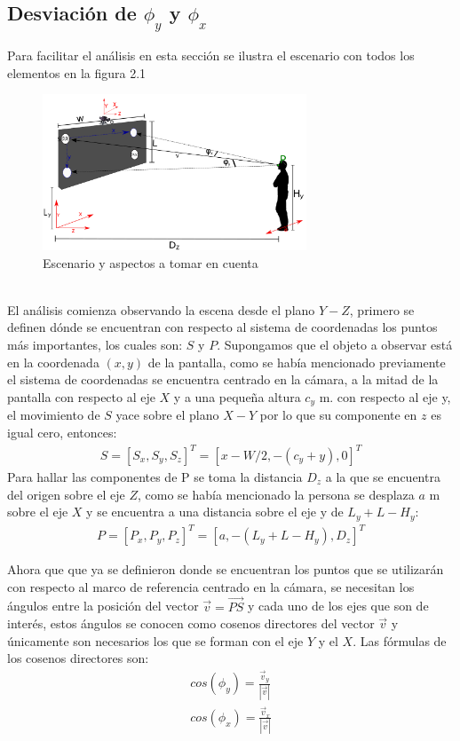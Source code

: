 \documentclass[paper=a4, fontsize=11pt]{scrartcl} %
\numberwithin{equation}{section} %
\numberwithin{figure}{section} %
\numberwithin{table}{section} %
\begin{document}
\subsection{Desviación de $\phi_y$ y $\phi_x$}
Para facilitar el análisis en esta sección se ilustra el escenario con todos los elementos en la figura 2.1
\begin{figure}[htbp]
	\centering
	\includegraphics[width=0.7\textwidth]{escenario}
	\caption{Escenario y aspectos a tomar en cuenta}\label{fig: figura}
\end{figure}
\\El análisis comienza observando la escena desde el plano $Y-Z$, primero se definen dónde se encuentran con respecto al sistema de coordenadas los puntos más importantes, los cuales son: $S$ y $P$. Supongamos que el objeto a observar está en la coordenada $(x,y)$ de la pantalla, como se había mencionado previamente el sistema de coordenadas se encuentra centrado en la cámara,  a la mitad de la pantalla con respecto al eje $X$ y a una pequeña altura $c_y$ m. con respecto al eje y, el movimiento de $S$ yace sobre el plano $X-Y$ por lo que su componente en $z$ es igual cero, entonces:
\begin{eqnarray}
S= [S_x, S_y, S_z]^T= [x-W/2, -(c_y+y), 0]^T
 \end{eqnarray}
Para hallar las componentes de P se toma la distancia $D_z$ a la que se encuentra del origen sobre el eje $Z$, como se había mencionado la persona se desplaza $a$ m sobre el eje $X$ y se encuentra a una distancia sobre el eje y de $L_y+L-H_y$:
\begin{eqnarray}
 P=[P_x, P_y, P_z]^T= [a, -(L_y+L-H_y), D_z]^T
 \end{eqnarray}
 
 Ahora que que ya se definieron donde se encuentran los puntos que se utilizarán con respecto al marco de referencia centrado en la cámara, se necesitan los ángulos entre la posición del vector $\vec v=\vec {PS}$ y cada uno de los ejes que son de interés, estos ángulos se conocen como cosenos directores del vector $\vec v$ y únicamente son necesarios los que se forman con el eje $Y$ y el $X$.
 Las fórmulas de los cosenos directores son:
 \begin{eqnarray}
 cos(\phi_y)=\frac{\vec v_y}{|\vec v|}\\
  cos(\phi_x)=\frac{\vec v_x}{|\vec v|}
  \end{eqnarray}
 
\end{document}
